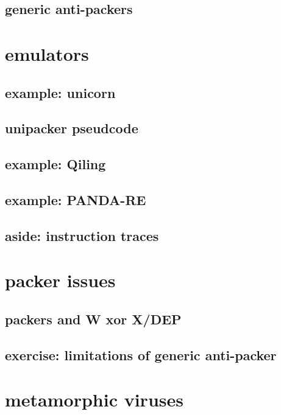 \subsection{generic anti-packers}



\section{emulators}
\subsection{example: unicorn}


\subsection{unipacker pseudcode}


\subsection{example: Qiling}

\subsection{example: PANDA-RE}


\subsection{aside: instruction traces}


\section{packer issues}
\subsection{packers and W xor X/DEP}


\subsection{exercise: limitations of generic anti-packer}


\section{metamorphic viruses}


